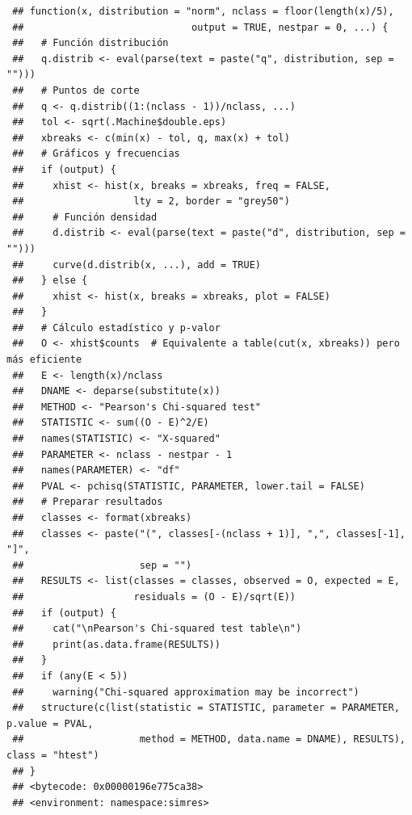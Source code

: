 \documentclass[
  spanish,
  10pt,
]{book}
\theoremstyle{break}
\theoremstyle{nonumberplain}
\begin{document}
\begin{verbatim}
 ## function(x, distribution = "norm", nclass = floor(length(x)/5),
 ##                             output = TRUE, nestpar = 0, ...) {
 ##   # Función distribución
 ##   q.distrib <- eval(parse(text = paste("q", distribution, sep = "")))
 ##   # Puntos de corte
 ##   q <- q.distrib((1:(nclass - 1))/nclass, ...)
 ##   tol <- sqrt(.Machine$double.eps)
 ##   xbreaks <- c(min(x) - tol, q, max(x) + tol)
 ##   # Gráficos y frecuencias
 ##   if (output) {
 ##     xhist <- hist(x, breaks = xbreaks, freq = FALSE,
 ##                   lty = 2, border = "grey50")
 ##     # Función densidad
 ##     d.distrib <- eval(parse(text = paste("d", distribution, sep = "")))
 ##     curve(d.distrib(x, ...), add = TRUE)
 ##   } else {
 ##     xhist <- hist(x, breaks = xbreaks, plot = FALSE)
 ##   }
 ##   # Cálculo estadístico y p-valor
 ##   O <- xhist$counts  # Equivalente a table(cut(x, xbreaks)) pero más eficiente
 ##   E <- length(x)/nclass
 ##   DNAME <- deparse(substitute(x))
 ##   METHOD <- "Pearson's Chi-squared test"
 ##   STATISTIC <- sum((O - E)^2/E)
 ##   names(STATISTIC) <- "X-squared"
 ##   PARAMETER <- nclass - nestpar - 1
 ##   names(PARAMETER) <- "df"
 ##   PVAL <- pchisq(STATISTIC, PARAMETER, lower.tail = FALSE)
 ##   # Preparar resultados
 ##   classes <- format(xbreaks)
 ##   classes <- paste("(", classes[-(nclass + 1)], ",", classes[-1], "]",
 ##                    sep = "")
 ##   RESULTS <- list(classes = classes, observed = O, expected = E,
 ##                   residuals = (O - E)/sqrt(E))
 ##   if (output) {
 ##     cat("\nPearson's Chi-squared test table\n")
 ##     print(as.data.frame(RESULTS))
 ##   }
 ##   if (any(E < 5))
 ##     warning("Chi-squared approximation may be incorrect")
 ##   structure(c(list(statistic = STATISTIC, parameter = PARAMETER, p.value = PVAL,
 ##                    method = METHOD, data.name = DNAME), RESULTS), class = "htest")
 ## }
 ## <bytecode: 0x00000196e775ca38>
 ## <environment: namespace:simres>
\end{verbatim}
\end{document}
